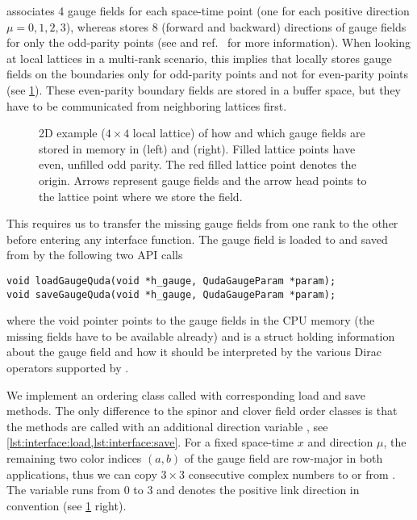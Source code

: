 \Quda associates \num{4} gauge fields for each space-time point (one for each positive direction $\mu=0,1,2,3$), whereas \openqxd stores \num{8} (forward and backward) directions of gauge fields for only the odd-parity points (see  and ref.~\cite{openqxd} for more information). When looking at local lattices in a multi-rank scenario, this implies that \openqxd locally stores gauge fields on the boundaries only for odd-parity points and not for even-parity points (see \cref{fig:gauge}). These even-parity boundary fields are stored in a buffer space, but they have to be communicated from neighboring lattices first.
\begin{figure}
  \caption{2D example ($4 \times 4$ local lattice) of how and which gauge fields are stored in memory in \openqxd (left) and \quda (right). Filled lattice points have even, unfilled odd parity. The red filled lattice point denotes the origin. Arrows represent gauge fields and the arrow head points to the lattice point where we store the field.}
  \label{fig:gauge}
\end{figure}

This requires us to transfer the missing gauge fields from one rank to the other before entering any \quda interface function. The gauge field is loaded to and saved from \quda by the following two API calls
\begin{verbatim}
void loadGaugeQuda(void *h_gauge, QudaGaugeParam *param);
void saveGaugeQuda(void *h_gauge, QudaGaugeParam *param);
\end{verbatim}
where the void pointer  points to the gauge fields in the CPU memory (the missing fields have to be available already) and  is a struct holding information about the gauge field and how it should be interpreted by the various Dirac operators supported by \quda.

We implement an ordering class called  with corresponding load and save methods.
The only difference to the spinor and clover field order classes is that the methods are called with an additional direction variable , see \cref{lst:interface:load,lst:interface:save}.
For a fixed space-time $x$ and direction $\mu$, the remaining two color indices $(a,b)$ of the gauge field are row-major in both applications, thus we can copy $3\times 3$ consecutive complex numbers to or from .
The variable  runs from $0$ to $3$ and denotes the positive link direction in \quda convention (see \cref{fig:gauge} right).

